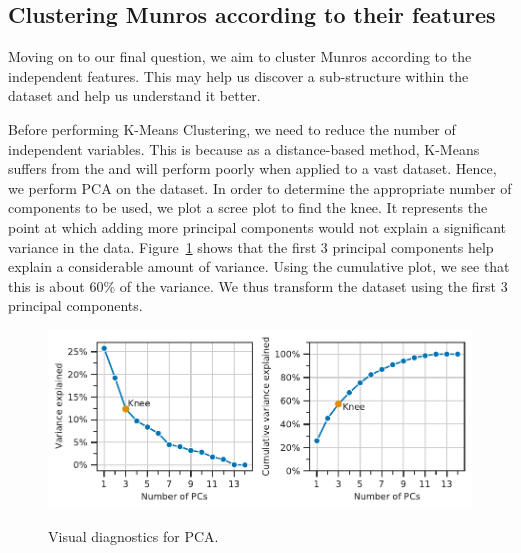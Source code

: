 \documentclass[11pt,a4paper]{article}
\begin{document}
\subsection{Clustering Munros according to their features}
Moving on to our final question, we aim to cluster Munros according to the independent features. This may help us discover a sub-structure within the dataset and help us understand it better.

Before performing K-Means Clustering, we need to reduce the number of independent variables. This is because as a distance-based method, K-Means suffers from the  and will perform poorly when applied to a vast dataset. Hence, we perform PCA on the dataset. In order to determine the appropriate number of components to be used, we plot a scree plot to find the knee. It represents the point at which adding more principal components would not explain a significant variance in the data. Figure~\ref{fds-project-template:fig:scree_plot} shows that the first 3 principal components help explain a considerable amount of variance. Using the cumulative plot, we see that this is about $60\%$ of the variance. We thus transform the dataset using the first 3 principal components.
\begin{figure} [h!]
    \centering
    \includegraphics{report/scree_plot.pdf}
    \begin{minipage}[t]{.5\linewidth}
        \centering
        \label{fds-project-template:fig:scree_plot_def}
    \end{minipage}%
    \begin{minipage}[t]{.5\linewidth}
        \centering
        \label{fds-project-template:fig:scree_plot_cum}
    \end{minipage}
    \caption{Visual diagnostics for PCA.}
    \label{fds-project-template:fig:scree_plot}
\end{figure}
\end{document}
